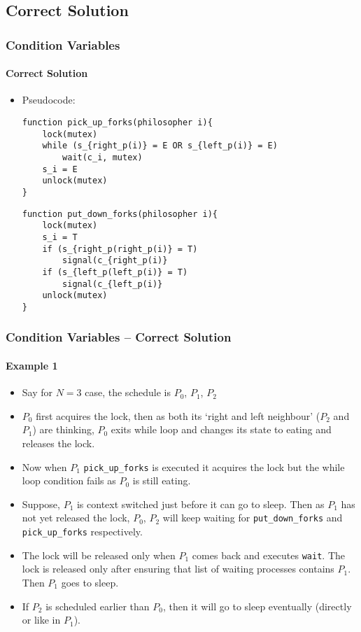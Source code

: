 \documentclass[aspectratio=169, handout, 10pt]{beamer}
\theoremstyle{example}
\begin{document}
\subsection{Correct Solution}
\begin{frame}[fragile]\frametitle{Condition Variables}\framesubtitle{Correct Solution}
  \small\begin{itemize}
  \pause\item Pseudocode:
\begin{Verbatim}[frame=single]
function pick_up_forks(philosopher i){
    lock(mutex)
    while (s_{right_p(i)} = E OR s_{left_p(i)} = E)
        wait(c_i, mutex)
    s_i = E
    unlock(mutex)
}
\end{Verbatim}
\begin{Verbatim}[frame=single]
function put_down_forks(philosopher i){
    lock(mutex)
    s_i = T
    if (s_{right_p(right_p(i)} = T)
        signal(c_{right_p(i)}
    if (s_{left_p(left_p(i)} = T)
        signal(c_{left_p(i)}
    unlock(mutex)
}
\end{Verbatim}
  \end{itemize}
\end{frame}
\begin{frame}[fragile]\frametitle{Condition Variables -- Correct Solution}\framesubtitle{Example 1}
  \begin{example}
  \begin{itemize}
  \pause\item Say for $N=3$ case, the schedule is $P_0$, $P_1$, $P_2$
  \pause\item $P_0$ first acquires the lock, then as both its `right and left neighbour' ($P_2$ and $P_1$) are thinking, $P_0$ exits while loop and changes its state to eating and releases the lock.
  \pause\item Now when $P_1$ \verb!pick_up_forks! is executed it acquires the lock but the while loop condition fails as $P_0$ is still eating.
  \pause\item Suppose, $P_1$ is context switched just before it can go to sleep. Then as $P_1$ has not yet released the lock, $P_0$, $P_2$ will keep waiting for \verb!put_down_forks! and \verb!pick_up_forks! respectively.
  \pause\item The lock will be released only when $P_1$ comes back and executes \verb!wait!. The lock is released only after ensuring that list of waiting processes contains $P_1$. Then $P_1$ goes to sleep.
  \pause\item If $P_2$ is scheduled earlier than $P_0$, then it will go to sleep eventually (directly or like in $P_1$).
  \end{itemize}
  \end{example}
\end{frame}
\end{document}

